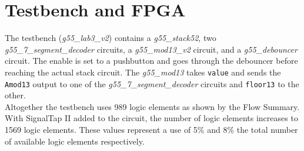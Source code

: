 \documentclass[12pt]{article}
\begin{document}
\section{Testbench and FPGA}
The testbench (\textit{g55\_lab3\_v2}) contains a \textit{g55\_stack52}, two \textit{g55\_7\_segment\_decoder} circuits, a \textit{g55\_mod13\_v2} circuit, and a \textit{g55\_debouncer} circuit. The enable is set to a pushbutton and goes through the debouncer before reaching the actual stack circuit. The \textit{g55\_mod13} takes \texttt{value} and sends the \texttt{Amod13} output to one of the \textit{g55\_7\_segment\_decoder} circuits and \texttt{floor13} to the other.\\

Altogether the testbench uses 989 logic elements as shown by the Flow Summary. With SignalTap II added to the circuit, the number of logic elements increases to 1569 logic elements. These values represent a use of 5\% and 8\% the total number of available logic elements respectively.
\end{document}
